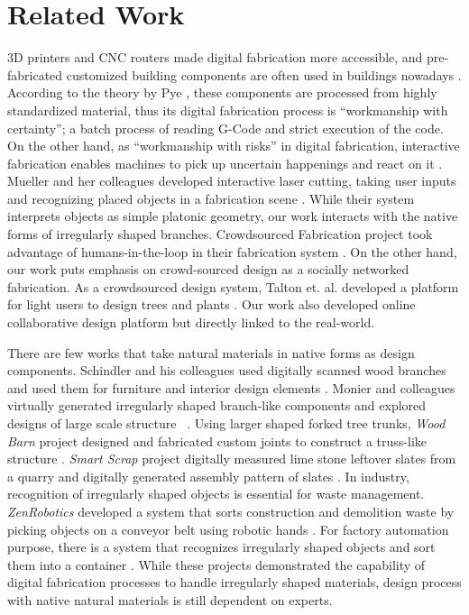 \section{Related Work}
3D printers and CNC routers made digital fabrication more accessible, and pre-fabricated customized building components are often used in buildings nowadays \cite{knaack2012prefabricated}.
According to the theory by Pye , these components are processed from highly standardized material, thus its digital fabrication process is ``workmanship with certainty''; a batch process of reading G-Code and strict execution of the code.
On the other hand, as ``workmanship with risks'' in digital fabrication, interactive fabrication enables machines to pick up uncertain happenings and react on it \cite{willis2011interactive}.
Mueller and her colleagues developed interactive laser cutting, taking user inputs and recognizing placed objects in a fabrication scene \cite{Mueller:2012:ICI:2380116.2380191}.
While their system interprets objects as simple platonic geometry, our work interacts with the native forms of irregularly shaped branches.
Crowdsourced Fabrication project took advantage of humans-in-the-loop in their fabrication system \cite{lafreniere2016crowdsourced}.
On the other hand, our work puts emphasis on crowd-sourced design as a socially networked fabrication.
As a crowdsourced design system, Talton et. al. developed a platform for light users to design trees and plants \cite{talton2009exploratory}.
Our work also developed online collaborative design platform but directly linked to the real-world.

There are few works that take natural materials in native forms as design components.
Schindler and his colleagues used digitally scanned wood branches and used them for furniture and interior design elements \cite{schindler2014processing}.
Monier and colleagues virtually generated irregularly shaped branch-like components and explored designs of large scale structure ~\cite{monier2013use}.
Using larger shaped forked tree trunks, \textit{Wood Barn} project designed and fabricated custom joints to construct a truss-like structure \cite{woodbarn}.
\textit{Smart Scrap} project digitally measured lime stone leftover slates from a quarry and digitally generated assembly pattern of slates \cite{smartscrap}.
In industry, recognition of irregularly shaped objects is essential for waste management.
\textit{ZenRobotics} developed a system that sorts construction and demolition waste by picking objects on a conveyor belt using robotic hands \cite{lukka2014zenrobotics}.
For factory automation purpose, there is a system that recognizes irregularly shaped objects and sort them into a container \cite{sujan2000design}.
While these projects demonstrated the capability of digital fabrication processes to handle irregularly shaped materials, design process with native natural materials is still dependent on experts.

